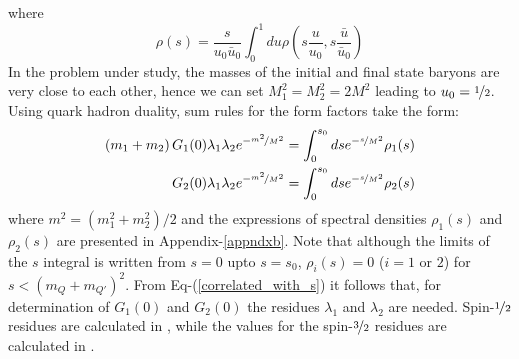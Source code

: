 where 
\begin{equation}
    \rho(s) = \frac{s}{u_0 \bar u_0} \int_0^1 du \rho\left( s \frac{u}{u_0}, s \frac{\bar u}{\bar u_0} \right) 
\end{equation}
%
In the problem under study, the masses of the initial and final state baryons are very close to each other, hence we can set $M_1^2 = M_2^2 = 2M^2$ leading to $u_0=\nicefrac{1}{2}$. 
%
Using quark hadron duality, sum rules for the form factors take the form:
%
\begin{equation}
    \begin{aligned}
        \left(m_1+m_2\right)G_1(0)\lambda_1\lambda_2e^{-\nicefrac{m^2}{M^2}} &= \int_0^{s_0} ds e^{-\nicefrac{s}{M^2}}\rho_1(s) \\
        G_2(0)\lambda_1\lambda_2e^{-\nicefrac{m^2}{M^2}} &= \int_0^{s_0} ds e^{-\nicefrac{s}{M^2}}\rho_2(s)
    \end{aligned}
    \label{correlated_with_s}
\end{equation}
%
where $m^2=(m_1^2+m_2^2)/2$ and the expressions of spectral densities $\rho_1(s)$ and $\rho_2(s)$ are presented in Appendix-\ref{appndxb}. Note that although the limits of the $s$ integral is written from $s=0$ upto $s=s_0$, $\rho_i(s)=0$ ($i=1$ or $2$) for $s < (m_Q+m_{Q'})^2$.
%
From Eq-(\ref{correlated_with_s}) it follows that, for determination of $G_1(0)$ and $G_2(0)$ the residues $\lambda_1$ and $\lambda_2$ are needed. Spin-$\nicefrac{1}{2}$ residues are calculated in \cite{AlievOctet}, while the values for the spin-$\nicefrac{3}{2}$ residues are calculated in \cite{AlievDecuplet}.

